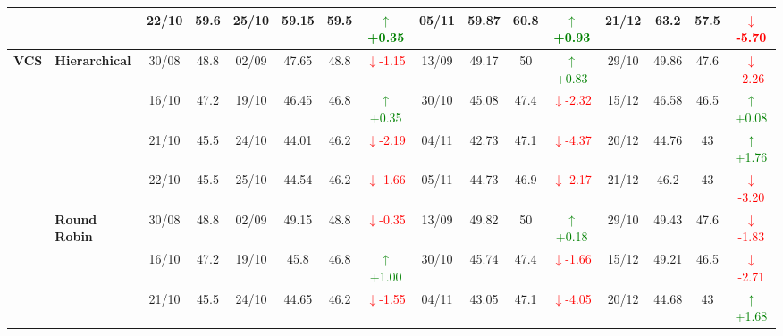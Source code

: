 {\begin{longtable}{llcc|cccc|cccc|cccc}
&
& 22/10 & 59.6 & 25/10 & 59.15 & 59.5 & \textcolor{green}{\(\uparrow\)+0.35} & 05/11 & 59.87 & 60.8 & \textcolor{green}{\(\uparrow\)+0.93} & 21/12 & 63.2 & 57.5 & \textcolor{red}{\(\downarrow\)-5.70} \\
\midrule



\multirow{12}{*}{\textbf{VCS}} 
& \textbf{Hierarchical}
& 30/08 & 48.8 & 02/09 & 47.65 & 48.8 & \textcolor{red}{\(\downarrow\)-1.15} & 13/09 & 49.17 & 50 & \textcolor{green}{\(\uparrow\)+0.83} & 29/10 & 49.86 & 47.6 & \textcolor{red}{\(\downarrow\)-2.26} \\

&
& 16/10 & 47.2 & 19/10 & 46.45 & 46.8 & \textcolor{green}{\(\uparrow\)+0.35} & 30/10 & 45.08 & 47.4 & \textcolor{red}{\(\downarrow\)-2.32} & 15/12 & 46.58 & 46.5 & \textcolor{green}{\(\uparrow\)+0.08} \\

&
& 21/10 & 45.5 & 24/10 & 44.01 & 46.2 & \textcolor{red}{\(\downarrow\)-2.19} & 04/11 & 42.73 & 47.1 & \textcolor{red}{\(\downarrow\)-4.37} & 20/12 & 44.76 & 43 & \textcolor{green}{\(\uparrow\)+1.76} \\

&
& 22/10 & 45.5 & 25/10 & 44.54 & 46.2 & \textcolor{red}{\(\downarrow\)-1.66} & 05/11 & 44.73 & 46.9 & \textcolor{red}{\(\downarrow\)-2.17} & 21/12 & 46.2 & 43 & \textcolor{red}{\(\downarrow\)-3.20} \\
\cmidrule(lr){2-16}


& \textbf{Round Robin}
& 30/08 & 48.8 & 02/09 & 49.15 & 48.8 & \textcolor{red}{\(\downarrow\)-0.35} & 13/09 & 49.82 & 50 & \textcolor{green}{\(\uparrow\)+0.18} & 29/10 & 49.43 & 47.6 & \textcolor{red}{\(\downarrow\)-1.83} \\

&
& 16/10 & 47.2 & 19/10 & 45.8 & 46.8 & \textcolor{green}{\(\uparrow\)+1.00} & 30/10 & 45.74 & 47.4 & \textcolor{red}{\(\downarrow\)-1.66} & 15/12 & 49.21 & 46.5 & \textcolor{red}{\(\downarrow\)-2.71} \\

&
& 21/10 & 45.5 & 24/10 & 44.65 & 46.2 & \textcolor{red}{\(\downarrow\)-1.55} & 04/11 & 43.05 & 47.1 & \textcolor{red}{\(\downarrow\)-4.05} & 20/12 & 44.68 & 43 & \textcolor{green}{\(\uparrow\)+1.68} \\


\end{longtable}}
